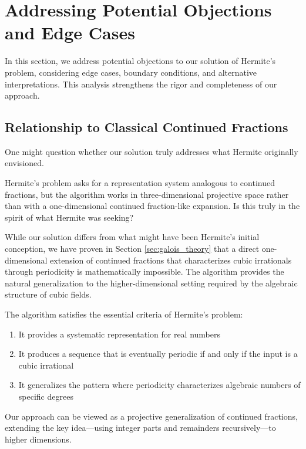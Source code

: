 \section{Addressing Potential Objections and Edge Cases}\label{sec:objections}

In this section, we address potential objections to our solution of Hermite's problem, considering edge cases, boundary conditions, and alternative interpretations. This analysis strengthens the rigor and completeness of our approach.

\subsection{Relationship to Classical Continued Fractions}

One might question whether our solution truly addresses what Hermite originally envisioned.

\begin{objection}
Hermite's problem asks for a representation system analogous to continued fractions, but the \HAPD{} algorithm works in three-dimensional projective space rather than with a one-dimensional continued fraction-like expansion. Is this truly in the spirit of what Hermite was seeking?
\end{objection}

\begin{response}
While our solution differs from what might have been Hermite's initial conception, we have proven in Section \ref{sec:galois_theory} that a direct one-dimensional extension of continued fractions that characterizes cubic irrationals through periodicity is mathematically impossible. The \HAPD{} algorithm provides the natural generalization to the higher-dimensional setting required by the algebraic structure of cubic fields.

The \HAPD{} algorithm satisfies the essential criteria of Hermite's problem:
\begin{enumerate}
    \item It provides a systematic representation for real numbers
    \item It produces a sequence that is eventually periodic if and only if the input is a cubic irrational
    \item It generalizes the pattern where periodicity characterizes algebraic numbers of specific degrees
\end{enumerate}

Our approach can be viewed as a projective generalization of continued fractions, extending the key idea—using integer parts and remainders recursively—to higher dimensions.
\end{response}

